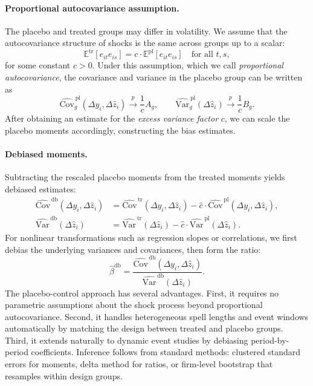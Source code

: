 \documentclass[11pt,a4paper]{article}
\newcommand{\Var}{\text{Var}}
\newcommand{\Cov}{\text{Cov}}
\begin{document}
\paragraph{Proportional autocovariance assumption.} The placebo and treated groups may differ in volatility. We assume that the autocovariance structure of shocks is the same across groups up to a scalar: 
\begin{equation}
  \mathbb{E}^{\text{tr}}[e_{it} e_{is}] = c \cdot \mathbb{E}^{\text{pl}}[e_{it} e_{is}] \quad \text{for all } t,s,
\end{equation}
for some constant $c>0$. Under this assumption, which we call \emph{proportional autocovariance}, the covariance and variance in the placebo group can be written as 
\begin{equation}
\widehat{\Cov}_g^{\,\text{pl}}(\Delta y_i,\Delta \hat z_i) \xrightarrow{p} \frac{1}{c} A_g,\qquad \widehat{\Var}_g^{\,\text{pl}}(\Delta \hat z_i) \xrightarrow{p} \frac{1}{c} B_g.
\end{equation}
After obtaining an estimate for the \emph{excess variance factor} $c$, we can scale the placebo moments accordingly,  constructing the bias estimates.

\paragraph{Debiased moments.} Subtracting the rescaled placebo moments from the treated moments yields debiased estimates:
\begin{align}
\widehat{\Cov}^{\,\text{db}}(\Delta y_i,\Delta \hat z_i) &= \widehat{\Cov}^{\,\text{tr}}(\Delta y_i,\Delta \hat z_i) - \hat c\cdot\widehat{\Cov}^{\,\text{pl}}(\Delta y_i,\Delta \hat z_i),\\
\widehat{\Var}^{\,\text{db}}(\Delta \hat z_i) &= \widehat{\Var}^{\,\text{tr}}(\Delta \hat z_i) - \hat c\cdot\widehat{\Var}^{\,\text{pl}}(\Delta \hat z_i).
\end{align}
For nonlinear transformations such as regression slopes or correlations, we first debias the underlying variances and covariances, then form the ratio:
\begin{equation}
\hat\beta^{\text{db}} = \frac{\widehat{\Cov}^{\,\text{db}}(\Delta y_i,\Delta \hat z_i)}{\widehat{\Var}^{\,\text{db}}(\Delta \hat z_i)}.
\end{equation}
The placebo-control approach has several advantages. First, it requires no parametric assumptions about the shock process beyond proportional autocovariance. Second, it handles heterogeneous spell lengths and event windows automatically by matching the design between treated and placebo groups. Third, it extends naturally to dynamic event studies by debiasing period-by-period coefficients. Inference follows from standard methods: clustered standard errors for moments, delta method for ratios, or firm-level bootstrap that resamples within design groups.
\end{document}
